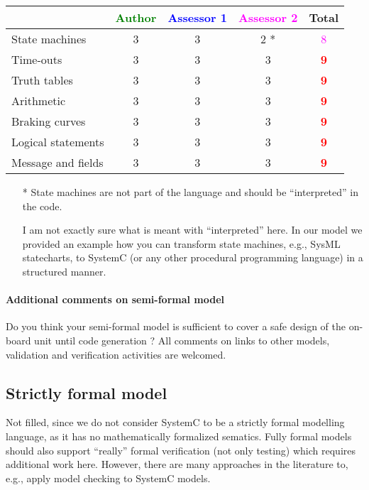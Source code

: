 \begin{tabular}{|l | c | c | c | c|}
\hline
& \textcolor{green}{Author} & \textcolor{blue}{Assessor 1} & \textcolor{magenta}{Assessor 2} & Total \\
\hline
State machines &3 &3 & 2   * & \textcolor{magenta}{8} \\
\hline
Time-outs &3 &3 &3 & \textcolor{red}{\textbf{9}} \\
\hline
Truth tables &3 &3 &3 & \textcolor{red}{\textbf{9}} \\
\hline
Arithmetic &3 &3 &3 & \textcolor{red}{\textbf{9}} \\
\hline
Braking curves &3 &3 &3 & \textcolor{red}{\textbf{9}} \\
\hline
Logical statements &3 &3 &3 & \textcolor{red}{\textbf{9}} \\
\hline
Message and fields &3 &3 &3 & \textcolor{red}{\textbf{9}} \\
\hline
\end{tabular}

\begin{assessor2}
  \begin{itemize}
  \item[*] State machines are not part of the language and should be
    ``interpreted'' in the code.
\begin{author_comment}
I am not exactly sure what is meant with ``interpreted'' here. In our model we provided an example how you can transform state machines, e.g., SysML statecharts, to SystemC (or any other procedural programming language) in a structured manner.
\end{author_comment}
  \end{itemize}  
\end{assessor2}



\paragraph{Additional comments on semi-formal model} Do you think your semi-formal model is sufficient to cover a safe design of the on-board unit until code generation ?
All comments on links to other models, validation and verification activities are welcomed.

\subsection{Strictly formal model}

\begin{author_comment}
Not filled, since we do not consider SystemC to be a strictly formal modelling language, as it has no mathematically formalized sematics. Fully formal models should also support ``really'' formal verification (not only testing) which requires additional work here. However, there are many approaches in the literature to, e.g., apply model checking to SystemC models.
\end{author_comment}


